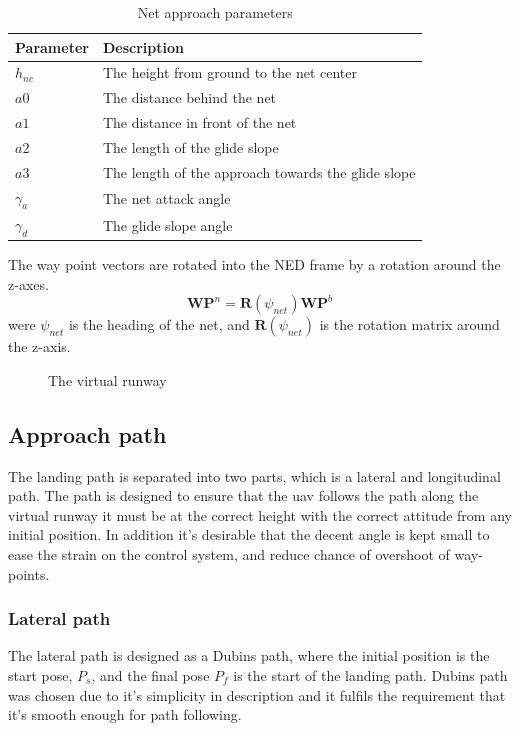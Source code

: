 \begin{table}[H]
\begin{center}
    \begin{tabular}{ | l | l |}
    \hline
    \textbf{Parameter} & \textbf{Description} \\ \hline
    $h_{nc}$ & The height from ground to the net center \\ \hline
    $a0$ & The distance behind the net \\ \hline
    $a1$ & The distance in front of the net \\ \hline
    $a2$ & The length of the glide slope \\ \hline
    $a3$ & The length of the approach towards the glide slope \\ \hline
    $\gamma_a$ & The net attack angle \\ \hline
    $\gamma_d$ & The glide slope angle \\ \hline
    \end{tabular}
\end{center}
\caption{Net approach parameters }
\label{Tb:Approach Parameters}
\end{table}
The way point vectors are rotated into the NED frame by a rotation around the z-axes.
\begin{equation}
\mathbf{WP}^n = \mathbf{R}(\psi_{net})\mathbf{WP}^b
\end{equation}
were $\psi_{net}$ is the heading of the net, and $\mathbf{R}(\psi_{net})$ is the rotation matrix around the z-axis.
\begin{figure}
\def\svgwidth{\textwidth} %

\caption{The virtual runway}
\label{Fig:LandingPhase}
\end{figure}

\subsection{Approach path}\label{SS:LandingApproach}
The landing path is separated into two parts, which is a lateral and longitudinal path. The path is designed to ensure that the \gls{uav} follows the path along the virtual runway it must be at the correct height with the correct attitude from any initial position. In addition it's desirable that the decent angle is kept small to ease the strain on the control system, and reduce chance of overshoot of way-points.
\subsubsection{Lateral path}
The lateral path is designed as a Dubins path, where the initial position is the start pose, $P_s$, and the final pose $P_f$ is the start of the landing path. Dubins path was chosen due to it's simplicity in description and it fulfils the requirement that it's smooth enough for path following.

